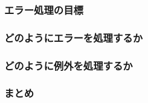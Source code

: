 
\subsubsection{エラー処理の目標}

\subsubsection{どのようにエラーを処理するか}

\subsubsection{どのように例外を処理するか}

\subsubsection{まとめ}

